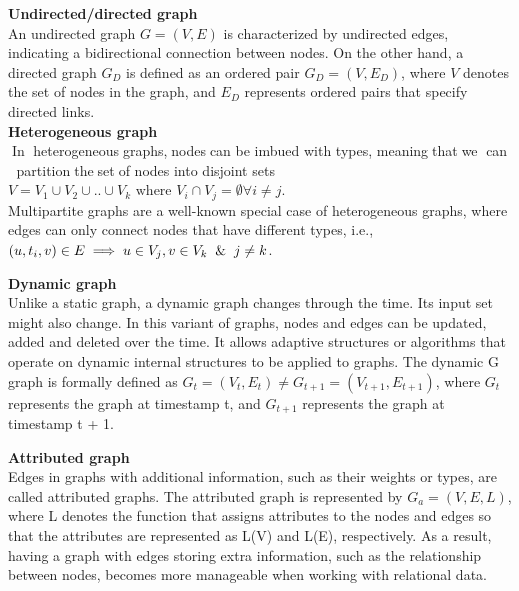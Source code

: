 \textbf{Undirected/directed graph}\\
An undirected graph \(G = (V, E)\) is characterized by undirected edges, indicating a bidirectional connection between nodes. On the other hand, a directed graph \(G_D\) is defined as an ordered pair \(G_D = (V, E_D)\), where \(V\) denotes the set of nodes in the graph, and \(E_D\) represents ordered pairs that specify directed links.\\

\textbf{Heterogeneous graph}\\
\label{heterog}
\textcolor{white}{.}In\textcolor{white}{.} heterogeneous\textcolor{white}{.}graphs,\textcolor{white}{.}nodes\textcolor{white}{.}can be imbued
with types, meaning\textcolor{white}{.}that\textcolor{white}{.}we \textcolor{white}{.}can \textcolor{white}{.} partition\textcolor{white}{.}the\textcolor{white}{.}set\textcolor{white}{.}of nodes into disjoint sets
$V = V_1  \cup  V_2  \cup  .. \cup  V_k \text{ where } V_i \cap V_j = \emptyset \forall i \neq j$. \\
Multipartite graphs are a well-known special case of heterogeneous graphs, where edges can only connect nodes that have different types, i.e., $(u, t_i, v) \in E \implies u \in  V_j , v \in V_k \And j \neq k$.

\textbf{Dynamic graph}\\
Unlike a static graph, a dynamic graph changes through the time. Its input set might also change. In this variant of graphs, nodes and edges can be updated, added and deleted over the time. It allows adaptive structures or algorithms that operate on dynamic  internal structures to be applied to graphs. 
The dynamic G graph is formally defined as $G_t = (V_t, E_t) \neq G_{t+1} = (V_{t+1}, E_{t+1})$, where $G_t$ represents the graph at timestamp t, and $G_{t+1}$ represents the graph at timestamp t + 1.

\textbf{Attributed graph }\\
Edges in graphs with additional information, such as their weights or types, are called attributed graphs. The attributed graph is represented by $G_a =  (V, E, L)$, where L denotes the function that assigns attributes to the nodes and edges so that the attributes are represented as L(V) and L(E), respectively. As a result, having a graph with edges storing extra information, such as the relationship between nodes, becomes more manageable when working with relational data.





